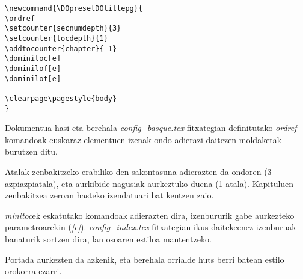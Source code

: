 \begin{verbatim}
\newcommand{\DOpresetDOtitlepg}{
\ordref
\setcounter{secnumdepth}{3}
\setcounter{tocdepth}{1}
\addtocounter{chapter}{-1}
\dominitoc[e]
\dominilof[e]
\dominilot[e]

\clearpage\pagestyle{body}
}
\end{verbatim}

Dokumentua hasi eta berehala \emph{config\_basque.tex} fitxategian definitutako \emph{ordref} komandoak euskaraz elementuen izenak ondo adierazi daitezen moldaketak burutzen ditu.

Atalak zenbakitzeko erabiliko den sakontasuna adierazten da ondoren (3-azpiazpiatala), eta aurkibide nagusiak aurkeztuko duena (1-atala). Kapituluen zenbakitzea zeroan hasteko izendatuari bat kentzen zaio.

\emph{minitoc}ek eskatutako komandoak adierazten dira, izenbururik gabe aurkezteko parametroarekin (\emph{[e]}). \emph{config\_index.tex} fitxategian ikus daitekeenez izenburuak banaturik sortzen dira, lan osoaren estiloa mantentzeko.

Portada aurkezten da azkenik, eta berehala orrialde huts berri batean estilo orokorra ezarri.